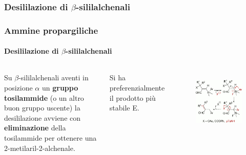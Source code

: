 
\subsubsection{Desililazione di $\beta$-sililalchenali}\begin{frame}\frametitle{Ammine propargiliche}\framesubtitle{Desililazione di $\beta$-sililalchenali}
\begin{columns}
Su $\beta$-sililalchenali aventi in posizione $\alpha$ un {\bf gruppo tosilammide} (o un altro buon gruppo uscente) la desililazione avviene con {\bf eliminazione} della tosilammide per ottenere una 2-metilaril-2-alchenale.

Si ha preferenzialmente il prodotto più stabile E.

\begin{figure}{\includegraphics[width=1\textwidth]{img/substrati/ammine-desilil2.png}}\end{figure}
\end{columns}

\end{frame}

